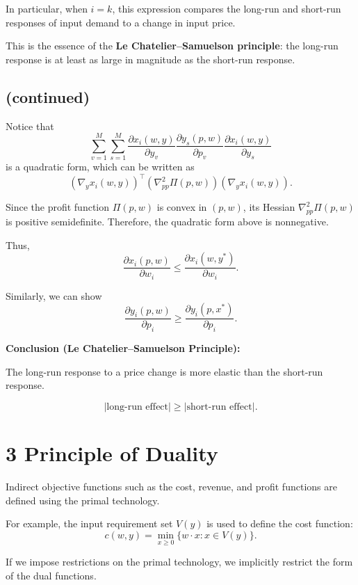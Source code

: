In particular, when $i=k$, this expression compares the long-run and short-run
responses of input demand to a change in input price.

This is the essence of the \textbf{Le Chatelier--Samuelson principle}:
the long-run response is at least as large in magnitude as the short-run response.




\subsection*{(continued)}

Notice that
\[
\sum_{v=1}^M \sum_{s=1}^M
\frac{\partial x_i(w,y)}{\partial y_v}
\frac{\partial y_s(p,w)}{\partial p_v}
\frac{\partial x_i(w,y)}{\partial y_s}
\]
is a quadratic form, which can be written as
\[
\left( \nabla_y x_i(w,y) \right)^\top
\left( \nabla^2_{pp} \Pi(p,w) \right)
\left( \nabla_y x_i(w,y) \right).
\]

Since the profit function $\Pi(p,w)$ is convex in $(p,w)$,
its Hessian $\nabla^2_{pp}\Pi(p,w)$ is positive semidefinite.
Therefore, the quadratic form above is nonnegative.

\medskip

Thus,
\[
\frac{\partial x_i(p,w)}{\partial w_i}
\le
\frac{\partial x_i(w,y^*)}{\partial w_i}.
\]

Similarly, we can show
\[
\frac{\partial y_i(p,w)}{\partial p_i}
\ge
\frac{\partial y_i(p,x^*)}{\partial p_i}.
\]

\medskip

\textbf{Conclusion (Le Chatelier--Samuelson Principle):}

The long-run response to a price change is more elastic than the short-run response.

\[
|\text{long-run effect}| \ge |\text{short-run effect}|.
\]

\section{3 Principle of Duality}

Indirect objective functions such as the cost, revenue, and profit functions
are defined using the primal technology.

For example, the input requirement set $V(y)$ is used to define the cost function:
\[
c(w,y)=\min_{x \ge 0} \{ w \cdot x : x \in V(y) \}.
\]

\medskip

If we impose restrictions on the primal technology, we implicitly restrict
the form of the dual functions.

